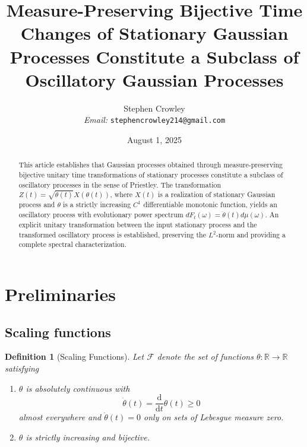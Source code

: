 \documentclass{article}
\newcommand{\tmemail}[1]{\\ \textit{Email:} \texttt{#1}}
\newtheorem{definition}{Definition}
\begin{document}
\title{Measure-Preserving Bijective Time Changes of Stationary Gaussian
Processes Constitute a Subclass of Oscillatory Gaussian Processes}

\author{
  Stephen Crowley
  \tmemail{stephencrowley214@gmail.com}
}

\date{August 1, 2025}

\maketitle

\begin{abstract}
  This article establishes that Gaussian processes obtained through
  measure-preserving bijective unitary time transformations of stationary
  processes constitute a subclass of oscillatory processes in the sense of
  Priestley. The transformation $Z (t) = \sqrt{\dot{\theta} (t)} X (\theta
  (t))$, where $X (t)$ is a realization of stationary Gaussian process and
  $\theta$ is a strictly increasing $C^1$ differentiable monotonic function,
  yields an oscillatory process with evolutionary power spectrum $dF_t
  (\omega) = \dot{\theta} (t) d \mu (\omega)$. An explicit unitary
  transformation between the input stationary process and the transformed
  oscillatory process is established, preserving the $L^2$-norm and providing
  a complete spectral characterization.
\end{abstract}

{\tableofcontents}

\section{Preliminaries}

\subsection{Scaling functions}\label{sec:scaling}

\begin{definition}[Scaling Functions]
  \label{def:scaling}Let $\mathcal{F}$ denote the set of functions $\theta :
  \mathbb{R} \to \mathbb{R}$ satisfying
  \begin{enumerate}
    \item $\theta$ is absolutely continuous with
    \begin{equation}
      \dot{\theta} (t) = \frac{\mathrm{d}}{\mathrm{d} t} \theta (t) \geq 0
    \end{equation}
    almost everywhere and $\dot{\theta} (t) = 0$ only on sets of Lebesgue
    measure zero.
    
    \item $\theta$ is strictly increasing and bijective.
  \end{enumerate}
\end{definition}
\end{document}

